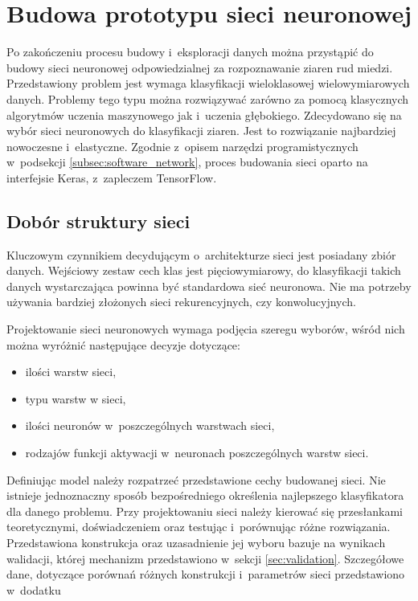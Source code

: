 \section{Budowa prototypu sieci neuronowej}
Po zakończeniu procesu budowy i~eksploracji danych można przystąpić do
budowy sieci neuronowej odpowiedzialnej za rozpoznawanie ziaren rud miedzi.
Przedstawiony problem jest wymaga klasyfikacji wieloklasowej wielowymiarowych
danych.
Problemy tego typu można rozwiązywać zarówno za pomocą klasycznych algorytmów
uczenia maszynowego jak i~uczenia głębokiego.
Zdecydowano się na wybór sieci neuronowych do klasyfikacji ziaren.
Jest to rozwiązanie najbardziej nowoczesne i~elastyczne.
Zgodnie z~opisem narzędzi programistycznych w~podsekcji
\ref{subsec:software_network}, proces budowania sieci oparto na interfejsie
Keras, z~zapleczem TensorFlow.

\subsection{Dobór struktury sieci} \label{subsec:nnbuild}
Kluczowym czynnikiem decydującym o~architekturze sieci jest posiadany
zbiór danych.
Wejściowy zestaw cech klas jest pięciowymiarowy, do klasyfikacji takich
danych wystarczająca powinna być standardowa sieć neuronowa.
Nie ma potrzeby używania bardziej złożonych sieci rekurencyjnych, czy
konwolucyjnych.

Projektowanie sieci neuronowych wymaga podjęcia szeregu wyborów, wśród nich
można wyróżnić następujące decyzje dotyczące:
\begin{itemize}
	\item ilości warstw sieci,
	\item typu warstw w sieci,
	\item ilości neuronów w~poszczególnych warstwach sieci,
	\item rodzajów funkcji aktywacji w~neuronach poszczególnych warstw sieci.
\end{itemize}
Definiując model należy rozpatrzeć przedstawione cechy budowanej sieci.
Nie istnieje jednoznaczny sposób bezpośredniego określenia najlepszego
klasyfikatora dla danego problemu.
Przy projektowaniu sieci należy kierować się przesłankami teoretycznymi,
doświadczeniem oraz testując i~porównując różne rozwiązania.
Przedstawiona konstrukcja oraz uzasadnienie jej wyboru bazuje na wynikach
walidacji, której mechanizm przedstawiono w~sekcji \ref{sec:validation}.
Szczegółowe dane, dotyczące porównań różnych konstrukcji i~parametrów
sieci przedstawiono w~dodatku %

